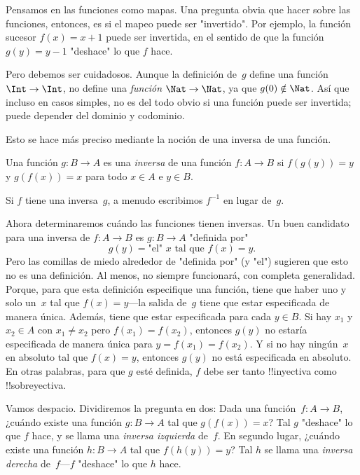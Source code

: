 \documentclass[../../../include/open-logic-section]{subfiles}
\begin{document}

\begin{explain}
Pensamos en las funciones como mapas. Una pregunta obvia que hacer sobre
las funciones, entonces, es si el mapeo puede ser "invertido". Por
ejemplo, la función sucesor $f(x) = x + 1$ puede ser invertida, en
el sentido de que la función $g(y) = y - 1$ "deshace" lo que $f$ hace.

Pero debemos ser cuidadosos. Aunque la definición de~$g$ define una
función $\Int \to \Int$, no define una \emph{función} $\Nat \to \Nat$, ya que $g(0) \notin \Nat$. Así que incluso en casos simples, no es del todo obvio si una función puede ser invertida; puede depender del dominio y codominio.

Esto se hace más preciso mediante la noción de una inversa de una función.
\end{explain}

\begin{defn}
Una función $g \colon B \to A$ es una \emph{inversa} de una función $f
\colon A \to B$ si $f(g(y)) = y$ y $g(f(x)) = x$ para todo $x \in A$
e $y \in B$.
\end{defn}

Si $f$ tiene una inversa~$g$, a menudo escribimos $f^{-1}$ en lugar de~$g$.

\begin{explain}
Ahora determinaremos cuándo las funciones tienen inversas. Un buen candidato
para una inversa de $f\colon A \to B$ es $g\colon B \to A$ "definida
por"
\[
g(y) = \text{"el" $x$ tal que $f(x) = y$.}
\]
Pero las comillas de miedo alrededor de "definida por" (y "el") sugieren que
esto no es una definición. Al menos, no siempre funcionará, con
completa generalidad. Porque, para que esta definición especifique una
función, tiene que haber uno y solo un~$x$ tal que $f(x) =
y$---la salida de~$g$ tiene que estar especificada de manera única. Además, tiene que estar especificada para cada $y \in B$. Si hay $x_1$ y $x_2 \in
A$ con $x_1 \neq x_2$ pero $f(x_1) = f(x_2)$, entonces $g(y)$ no estaría
especificada de manera única para $y = f(x_1) = f(x_2)$. Y si no hay ningún~$x$
en absoluto tal que $f(x) = y$, entonces $g(y)$ no está especificada en absoluto. En otras palabras, para que $g$ esté definida, $f$ debe ser tanto !!{inyectiva} como !!{sobreyectiva}.

Vamos despacio. Dividiremos la pregunta en dos: Dada una
función~$f\colon A \to B$, ¿cuándo existe una función $g\colon B \to A$
tal que $g(f(x)) = x$? Tal $g$ "deshace" lo que $f$ hace, y se
llama una \emph{inversa izquierda} de~$f$. En segundo lugar, ¿cuándo existe una
función $h\colon B \to A$ tal que $f(h(y)) = y$? Tal $h$ se
llama una \emph{inversa derecha} de~$f$---$f$ "deshace" lo que $h$ hace.
\end{explain}
\end{document}

